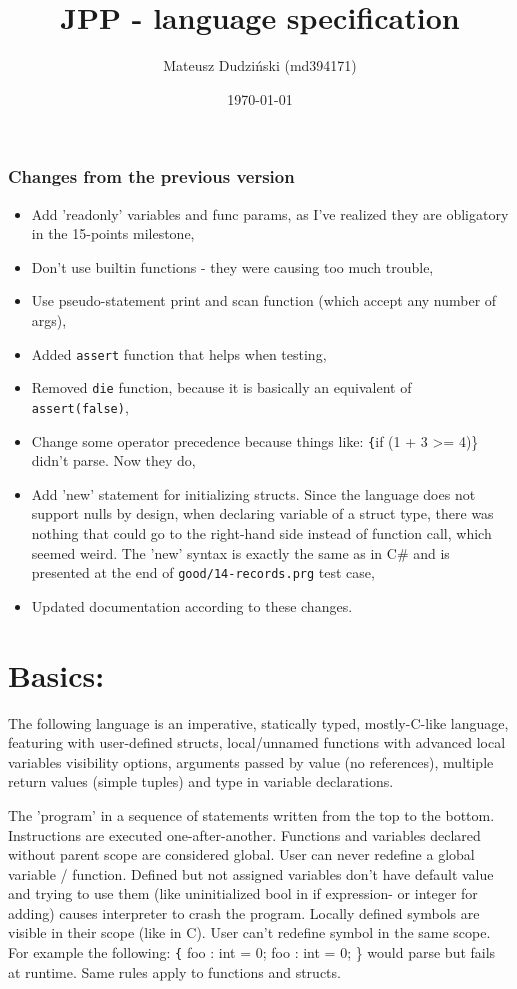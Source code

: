 \documentclass[11pt]{article}
\author{Mateusz Dudziński (md394171)}
\date{\today}
\title{JPP - language specification}
\begin{document}
\maketitle

\subsubsection*{Changes from the previous version}
\label{sec:orgcd0aa69}
\begin{itemize}
\item Add 'readonly' variables and func params, as I've realized they are
obligatory in the 15-points milestone,
\item Don't use builtin functions - they were causing too much trouble,
\item Use pseudo-statement print and scan function (which accept any number of
args),
\item Added \texttt{assert} function that helps when testing,
\item Removed \texttt{die} function, because it is basically an equivalent of
\texttt{assert(false)},
\item Change some operator precedence because things like: \texttt\{if (1 + 3 >=
4)\} didn't parse. Now they do,
\item Add 'new' statement for initializing structs. Since the language does not
support nulls by design, when declaring variable of a struct type, there was
nothing that could go to the right-hand side instead of function call, which
seemed weird. The 'new' syntax is exactly the same as in C\# and is presented
at the end of \texttt{good/14-records.prg} test case,
\item Updated documentation according to these changes.
\end{itemize}


\section*{Basics:}
\label{sec:org8b00c75}
The following language is an imperative, statically typed, mostly-C-like
language, featuring with user-defined structs, local/unnamed functions with
advanced local variables visibility options, arguments passed by value (no
references), multiple return values (simple tuples) and type in variable
declarations.

The 'program' in a sequence of statements written from the top to the bottom.
Instructions are executed one-after-another.  Functions and variables declared
without parent scope are considered global.  User can never redefine a global
variable / function. Defined but not assigned variables don't have default
value and trying to use them (like uninitialized bool in if expression- or
integer for adding) causes interpreter to crash the program. Locally defined
symbols are visible in their scope (like in C). User can't redefine symbol in
the same scope. For example the following: \texttt\{ foo : int = 0; foo : int =
0; \} would parse but fails at runtime. Same rules apply to functions and
structs.
\end{document}
